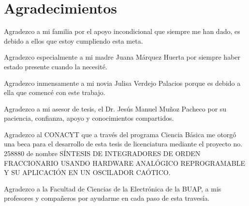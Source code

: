 \chapter{Agradecimientos}

Agradezco a mi familia por el apoyo incondicional que siempre me han dado, es debido a ellos que estoy cumpliendo esta meta.

Agradezco especialmente a mi madre Juana Márquez Huerta por siempre haber estado presente cuando la necesité.

Agradezco inmensamente a mi novia Julisa Verdejo Palacios porque es debido a ella que comencé con este trabajo.

Agradezco a mi asesor de tesis, el Dr. Jesús Manuel Muñoz Pacheco por su paciencia, confianza, apoyo y conocimientos compartidos.

Agradezco al CONACYT que a través del programa Ciencia Básica me otorgó una beca para el desarrollo de esta tesis de licenciatura mediante el proyecto no. 258880 de nombre SÍNTESIS DE INTEGRADORES DE ORDEN FRACCIONARIO USANDO HARDWARE ANALÓGICO REPROGRAMABLE Y SU APLICACIÓN EN UN OSCILADOR CAÓTICO.

Agradezco a la Facultad de Ciencias de la Electrónica de la BUAP, a mis profesores y compañeros por ayudarme en cada paso de esta travesía.

